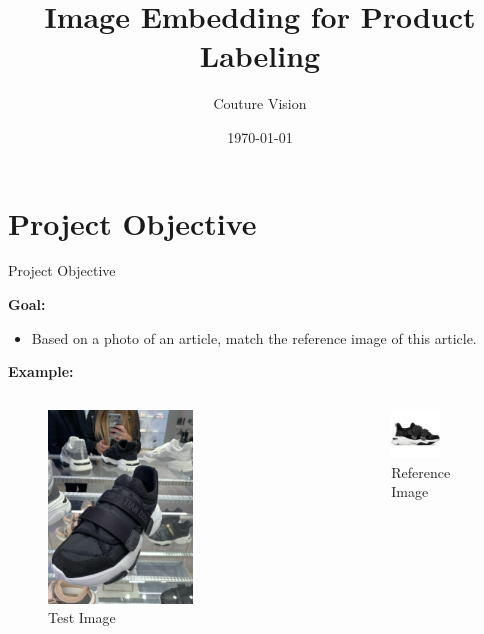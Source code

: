 \documentclass{beamer}
\title{Image Embedding for Product Labeling}
\author{Couture Vision}
\date{\today}
\begin{document}
\frame{\titlepage}

\section{Project Objective}
\begin{frame}{Project Objective}

\textbf{Goal:}
\begin{itemize}
    \item Based on a photo of an article, match the reference image of this article.
\end{itemize}

\textbf{Example:}
\begin{columns}
    \begin{figure}[t]
        \includegraphics[width=0.6\textwidth]{assets/shoe_test.jpg}
        \caption{Test Image}
    \end{figure}
    \begin{figure}[t]
        \includegraphics[width=0.6\textwidth]{assets/shoe_reference.jpeg}
        \caption{Reference Image}
    \end{figure}
\end{columns}

\end{frame}
\end{document}
